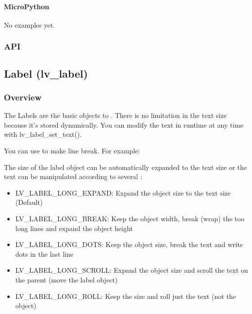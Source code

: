 \documentclass[letterpaper,10pt,english]{sphinxmanual}
\begin{document}
\paragraph{MicroPython}
\label{\detokenize{object-types/kb:micropython}}
No examples yet.


\subsubsection{API}
\label{\detokenize{object-types/kb:api}}

\subsection{Label (lv\_label)}
\label{\detokenize{object-types/label:label-lv-label}}\label{\detokenize{object-types/label::doc}}

\subsubsection{Overview}
\label{\detokenize{object-types/label:overview}}
The Labels are the basic objects to . There is no limitation in the text size because it’s stored dynamically. You can modify the text in runtime at any time with lv\_label\_set\_text().

You can use  to make line break. For example: 

The size of the label object can be automatically expanded to the text size or the text can be manipulated according to several :
\begin{itemize}
\item {} 
LV\_LABEL\_LONG\_EXPAND: Expand the object size to the text size (Default)

\item {} 
LV\_LABEL\_LONG\_BREAK: Keep the object width, break (wrap) the too long lines and expand the object height

\item {} 
LV\_LABEL\_LONG\_DOTS: Keep the object size, break the text and write dots in the last line

\item {} 
LV\_LABEL\_LONG\_SCROLL: Expand the object size and scroll the text on the parent (move the label object)

\item {} 
LV\_LABEL\_LONG\_ROLL: Keep the size and roll just the text (not the object)

\end{itemize}
\end{document}
